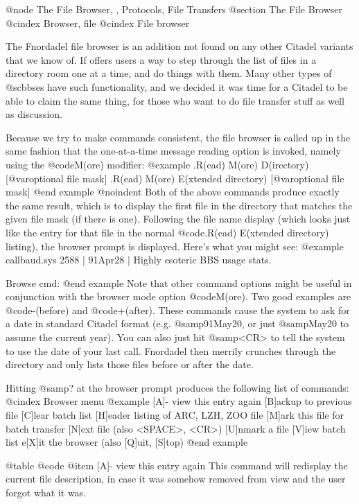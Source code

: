 @node The File Browser,  , Protocols, File Transfers
@section The File Browser
@cindex Browser, file
@cindex File browser

The Fnordadel file browser is an addition not found on any other
Citadel variants that we know of.  If offers users a way to step through the
list of files in a directory room one at a time, and do things with them.
Many other types of @sc{bbs}es have such functionality, and we decided it was
time for a Citadel to be able to claim the same thing, for those who want to
do file transfer stuff as well as discussion.

Because we try to make commands consistent, the file browser is
called up in the same fashion that the one-at-a-time message reading option
is invoked, namely using the @code{M(ore)} modifier:
@example
.R(ead) M(ore) D(irectory) [@var{optional file mask}]
.R(ead) M(ore) E(xtended directory) [@var{optional file mask}]
@end example
@noindent
Both of the above commands produce exactly the same result, which is
to display the first file in the directory that matches the given file mask
(if there is one).  Following the file name display (which looks just like
the entry for that file in the normal @code{.R(ead) E(xtended directory)}
listing),
the browser prompt is displayed.  Here's what you might see:
@example
callbaud.sys    2588 | 91Apr28 | Highly esoteric BBS usage stats.

Browse cmd:
@end example
Note that other command options might be useful in conjunction with
the browser mode option @code{M(ore)}.  Two good examples are
@code{-(before)} and @code{+(after)}.
These commands cause the
system to ask for a date in standard Citadel format (e.g. @samp{91May20},
or just
@samp{May20} to assume the current year).  You can also just hit @samp{<CR>}
to tell the
system to use the date of your last call.  Fnordadel then merrily crunches
through the directory and only lists those files before or after the date.

Hitting @samp{?} at the browser prompt produces the following list of
commands:
@cindex Browser menu
@example
[A]- view this entry again
[B]ackup to previous file
[C]lear batch list
[H]eader listing of ARC, LZH, ZOO file
[M]ark this file for batch transfer
[N]ext file (also <SPACE>, <CR>)
[U]nmark a file
[V]iew batch list
e[X]it the browser (also [Q]uit, [S]top)
@end example

@table @code
@item [A]- view this entry again
This command will redisplay the current file description, in case it
was somehow removed from view and the user forgot what it was.

